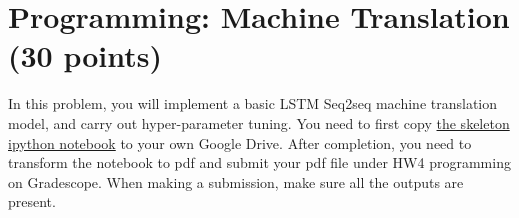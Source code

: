 \documentclass[twoside,10pt]{article}
\begin{document}

    
    
    



\newpage

\section{Programming: Machine Translation (30 points)}

In this problem, you will implement a basic LSTM Seq2seq machine translation model, and carry out hyper-parameter tuning. You need to first copy \href{https://colab.research.google.com/drive/1aVvsYv2lG4hgx4cXAqRZ0qEm3OEZ1ymh?usp=sharing}{the skeleton ipython notebook}  to your own Google Drive. After completion, you need to transform the notebook to pdf and submit your pdf file under HW4 programming on Gradescope. When making a submission, make sure all the outputs are present.
\end{document}
